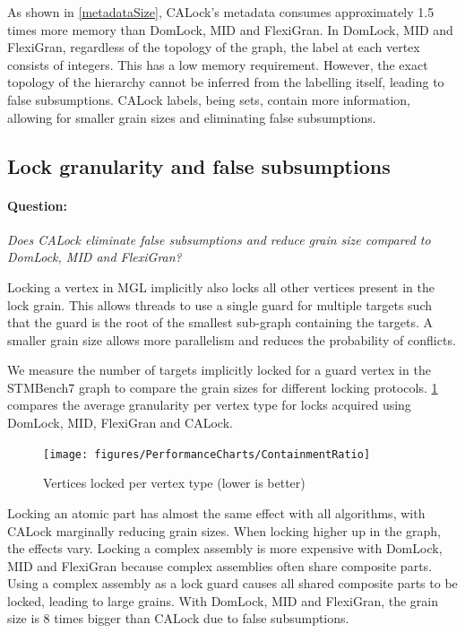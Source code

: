 As shown in \cref{metadataSize}, CALock's metadata consumes approximately 1.5 times more memory than DomLock, MID and FlexiGran.
In DomLock, MID and FlexiGran, regardless of the topology of the graph, the label at each vertex consists of integers.
This has a low memory requirement. However, the exact topology of the hierarchy cannot be inferred from the labelling itself, leading to false subsumptions.
CALock labels, being sets, contain more information, allowing for smaller grain sizes and eliminating false subsumptions.



\subsection{Lock granularity and false subsumptions}\label{benchmark:falseSubsumption}

\paragraph{Question:} \emph{Does CALock eliminate false subsumptions and reduce grain size compared to DomLock, MID and FlexiGran?}

Locking a vertex in MGL implicitly also locks all other vertices present in the lock grain. This allows threads to use a single guard for multiple targets such that the guard is the root of the smallest sub-graph containing the targets. A smaller grain size allows more parallelism and reduces the probability of conflicts. 

We measure the number of targets implicitly locked for a guard vertex in the STMBench7 graph to compare the grain sizes for different locking protocols. 
\cref{nodesLockedPerNodeType} compares the average granularity per vertex type for locks acquired using DomLock, MID, FlexiGran and CALock.

\begin{figure}[h]
	\centering
	\captionsetup{justification=centering}
	\texttt{[image: figures/PerformanceCharts/ContainmentRatio]}
	\caption{Vertices locked per vertex type (lower is better)}
	\label{nodesLockedPerNodeType}
\end{figure}

Locking an atomic part has almost the same effect with all algorithms, with CALock marginally reducing grain sizes. 
When locking higher up in the graph, the effects vary. 
Locking a complex assembly is more expensive with DomLock, MID and FlexiGran because complex assemblies often share composite parts. Using a complex assembly as a lock guard causes all shared composite parts to be locked, leading to large grains. With DomLock, MID and FlexiGran, the grain size is 8 times bigger than CALock due to false subsumptions. 

